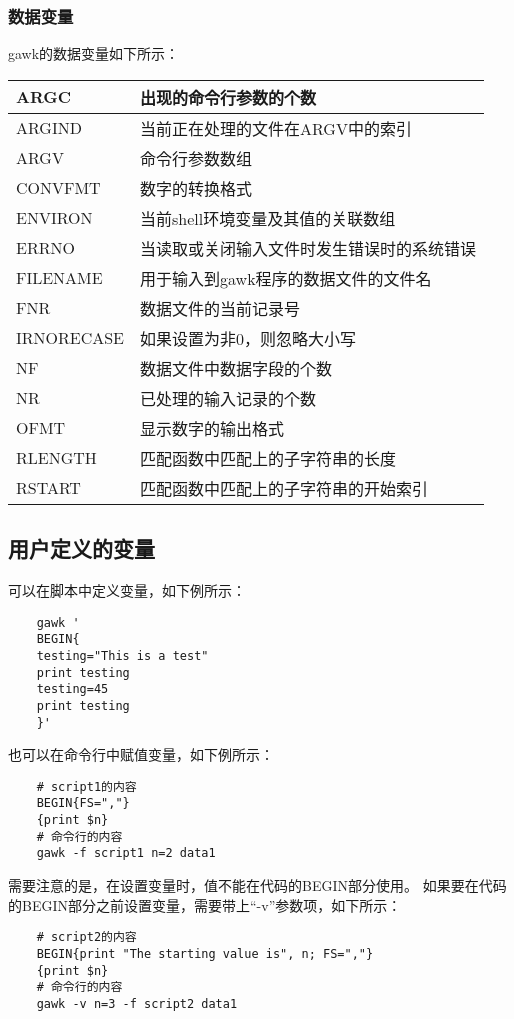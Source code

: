 \documentclass[a4paper,left=2.5cm,right=2.5cm,11pt]{article}
\begin{document}
\subsubsection{数据变量}
	gawk的数据变量如下所示：
	\begin{longtable}{p{3cm}p{6cm}}
	\hline
	ARGC & 出现的命令行参数的个数 \\
	\hline
	ARGIND & 当前正在处理的文件在ARGV中的索引 \\
	\hline
	ARGV & 命令行参数数组 \\
	\hline
	CONVFMT & 数字的转换格式 \\
	\hline
	ENVIRON & 当前shell环境变量及其值的关联数组 \\
	\hline
	ERRNO & 当读取或关闭输入文件时发生错误时的系统错误 \\
	\hline
	FILENAME & 用于输入到gawk程序的数据文件的文件名 \\
	\hline
	FNR & 数据文件的当前记录号 \\
	\hline
	IRNORECASE & 如果设置为非0，则忽略大小写 \\
	\hline
	NF & 数据文件中数据字段的个数 \\
	\hline
	NR & 已处理的输入记录的个数 \\
	\hline
	OFMT & 显示数字的输出格式 \\
	\hline
	RLENGTH & 匹配函数中匹配上的子字符串的长度 \\
	\hline
	RSTART & 匹配函数中匹配上的子字符串的开始索引 \\
	\hline
	\end{longtable}

\subsection{用户定义的变量}
	可以在脚本中定义变量，如下例所示：
	\begin{lstlisting}
	gawk '
	BEGIN{
	testing="This is a test"
	print testing
	testing=45
	print testing
	}'
	\end{lstlisting}

	也可以在命令行中赋值变量，如下例所示：
	\begin{lstlisting}
	# script1的内容
	BEGIN{FS=","}
	{print $n}
	# 命令行的内容
	gawk -f script1 n=2 data1
	\end{lstlisting}

	需要注意的是，在设置变量时，值不能在代码的BEGIN部分使用。
	如果要在代码的BEGIN部分之前设置变量，需要带上“-v”参数项，如下所示：
	\begin{lstlisting}
	# script2的内容
	BEGIN{print "The starting value is", n; FS=","}
	{print $n}
	# 命令行的内容
	gawk -v n=3 -f script2 data1
	\end{lstlisting}
\end{document}
